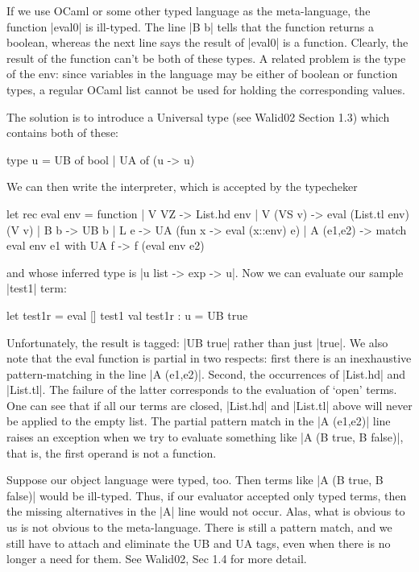 \documentclass[preprint]{sigplanconf}
\begin{document}
If we use OCaml or some other typed language as the meta-language, 
the function |eval0| is ill-typed. The line |B b|
tells that the function returns a boolean, whereas the next line says
the result of |eval0| is a function. Clearly, the result of the
function can't be both of these types. 
A related problem is the type of the env: since variables
in the language may be either of boolean or function types, a regular
OCaml list cannot be used for holding the corresponding values. 

The solution is to introduce a Universal type (see Walid02 Section
1.3) which contains both of these:

\begin{code}
  type u = UB of bool | UA of (u -> u)
\end{code}

We can then write the interpreter, which is accepted by the typecheker
\begin{code}
  let rec eval env = function
  | V VZ -> List.hd env
  | V (VS v) -> eval (List.tl env) (V v)
  | B b -> UB b
  | L e -> UA (fun x -> eval (x::env) e)
  | A (e1,e2) -> match eval env e1 with UA f -> f (eval env e2)
\end{code}
and whose inferred type is |u list -> exp -> u|. Now we can evaluate
our sample |test1| term:

\begin{code}
  let test1r = eval [] test1
  val test1r : u = UB true 
\end{code}

Unfortunately, the result is tagged: |UB true| rather than just
|true|. We also note that the eval function is partial in two
respects: first there is an inexhaustive pattern-matching in the 
line |A (e1,e2)|.
Second, the occurrences of |List.hd| and |List.tl|.
The failure of the latter corresponds to the evaluation of `open'
terms. One can see that if all our terms are closed, |List.hd| and
|List.tl| above will never be applied to the empty list. The partial
pattern match in the |A (e1,e2)| line raises an exception when we try to
evaluate something like |A (B true, B false)|, that is, the first
operand is not a function. 

Suppose our object language were typed, too. Then terms like
|A (B true, B false)| would be ill-typed. Thus, if our evaluator
accepted only typed terms, then the missing alternatives in the |A|
line would not occur. Alas, what is obvious to us is not obvious to
the meta-language. There is still a pattern match, and we still have
to attach and eliminate the UB and UA tags, even when there is no
longer a need for them. See Walid02, Sec 1.4 for more detail.
\end{document}
